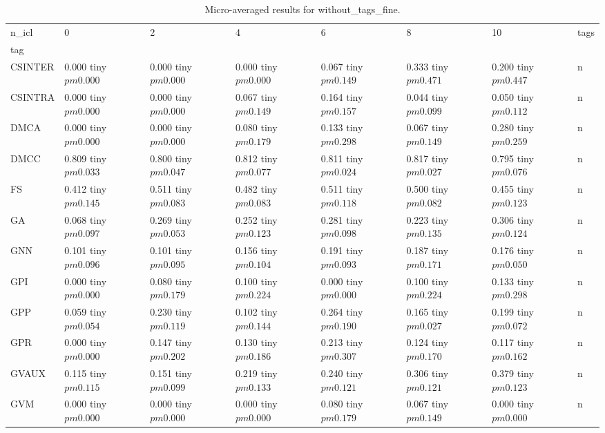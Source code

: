 \begin{table}
\caption{Micro-averaged results for without_tags_fine.}
\label{results_micro}
\begin{tabular}{llllllll}
\toprule
n_icl & 0 & 2 & 4 & 6 & 8 & 10 & tags \\
tag &  &  &  &  &  &  &  \\
\midrule
CSINTER & 0.000 tiny $ pm 0.000$ & 0.000 tiny $ pm 0.000$ & 0.000 tiny $ pm 0.000$ & 0.067 tiny $ pm 0.149$ & 0.333 tiny $ pm 0.471$ & 0.200 tiny $ pm 0.447$ & n \\
CSINTRA & 0.000 tiny $ pm 0.000$ & 0.000 tiny $ pm 0.000$ & 0.067 tiny $ pm 0.149$ & 0.164 tiny $ pm 0.157$ & 0.044 tiny $ pm 0.099$ & 0.050 tiny $ pm 0.112$ & n \\
DMCA & 0.000 tiny $ pm 0.000$ & 0.000 tiny $ pm 0.000$ & 0.080 tiny $ pm 0.179$ & 0.133 tiny $ pm 0.298$ & 0.067 tiny $ pm 0.149$ & 0.280 tiny $ pm 0.259$ & n \\
DMCC & 0.809 tiny $ pm 0.033$ & 0.800 tiny $ pm 0.047$ & 0.812 tiny $ pm 0.077$ & 0.811 tiny $ pm 0.024$ & 0.817 tiny $ pm 0.027$ & 0.795 tiny $ pm 0.076$ & n \\
FS & 0.412 tiny $ pm 0.145$ & 0.511 tiny $ pm 0.083$ & 0.482 tiny $ pm 0.083$ & 0.511 tiny $ pm 0.118$ & 0.500 tiny $ pm 0.082$ & 0.455 tiny $ pm 0.123$ & n \\
GA & 0.068 tiny $ pm 0.097$ & 0.269 tiny $ pm 0.053$ & 0.252 tiny $ pm 0.123$ & 0.281 tiny $ pm 0.098$ & 0.223 tiny $ pm 0.135$ & 0.306 tiny $ pm 0.124$ & n \\
GNN & 0.101 tiny $ pm 0.096$ & 0.101 tiny $ pm 0.095$ & 0.156 tiny $ pm 0.104$ & 0.191 tiny $ pm 0.093$ & 0.187 tiny $ pm 0.171$ & 0.176 tiny $ pm 0.050$ & n \\
GPI & 0.000 tiny $ pm 0.000$ & 0.080 tiny $ pm 0.179$ & 0.100 tiny $ pm 0.224$ & 0.000 tiny $ pm 0.000$ & 0.100 tiny $ pm 0.224$ & 0.133 tiny $ pm 0.298$ & n \\
GPP & 0.059 tiny $ pm 0.054$ & 0.230 tiny $ pm 0.119$ & 0.102 tiny $ pm 0.144$ & 0.264 tiny $ pm 0.190$ & 0.165 tiny $ pm 0.027$ & 0.199 tiny $ pm 0.072$ & n \\
GPR & 0.000 tiny $ pm 0.000$ & 0.147 tiny $ pm 0.202$ & 0.130 tiny $ pm 0.186$ & 0.213 tiny $ pm 0.307$ & 0.124 tiny $ pm 0.170$ & 0.117 tiny $ pm 0.162$ & n \\
GVAUX & 0.115 tiny $ pm 0.115$ & 0.151 tiny $ pm 0.099$ & 0.219 tiny $ pm 0.133$ & 0.240 tiny $ pm 0.121$ & 0.306 tiny $ pm 0.121$ & 0.379 tiny $ pm 0.123$ & n \\
GVM & 0.000 tiny $ pm 0.000$ & 0.000 tiny $ pm 0.000$ & 0.000 tiny $ pm 0.000$ & 0.080 tiny $ pm 0.179$ & 0.067 tiny $ pm 0.149$ & 0.000 tiny $ pm 0.000$ & n \\

\end{tabular}
\end{table}
